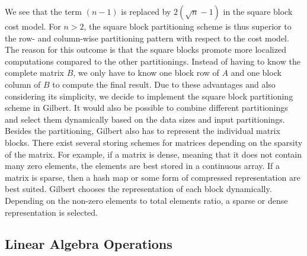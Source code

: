 We see that the term $(n-1)$ is replaced by $2\left(\sqrt{n}-1\right)$ in the square block cost model. For $n>2$, the square block partitioning scheme is thus superior to the row- and column-wise partitioning pattern with respect to the cost model. The reason for this outcome is that the square blocks promote more localized computations compared to the other partitionings. Instead of having to know the complete matrix $B$, we only have to know one block row of $A$ and one block column of $B$ to compute the final result. Due to these advantages and also considering its simplicity, we decide to implement the square block partitioning scheme in Gilbert. It would also be possible to combine different partitionings and select them dynamically based on the data sizes and input partitionings. Besides the partitioning, Gilbert also has to represent the individual matrix blocks. There exist several storing schemes for matrices depending on the sparsity of the matrix. For example, if a matrix is dense, meaning that it does not contain many zero elements, the elements are best stored in a continuous array. If a matrix is sparse, then a hash map or some form of compressed representation are best suited. Gilbert chooses the representation of each block dynamically. Depending on the non-zero elements to total elements ratio, a sparse or dense representation is selected.

\subsection{Linear Algebra Operations}
\label{sec:LinearAlgebraOperations}

